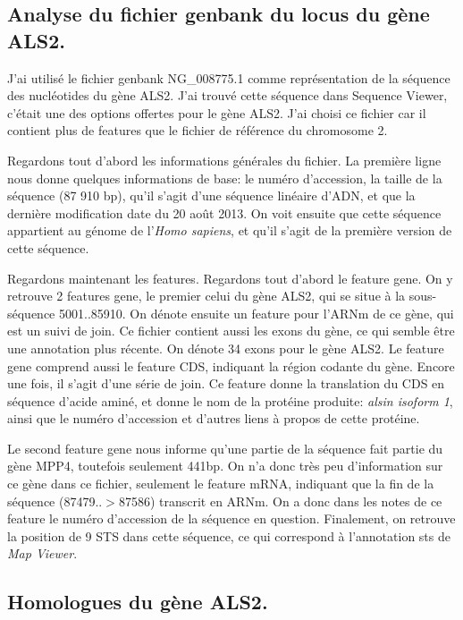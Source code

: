 \documentclass[10.9pt]{article} %
\begin{document}
\subsection[Fichier genbank du gène ALS2]{Analyse du fichier genbank du locus du gène ALS2.}

J'ai utilisé le fichier genbank NG\_008775.1 comme représentation de la séquence des nucléotides du gène ALS2. J'ai
trouvé cette séquence dans Sequence Viewer, c'était une des options offertes pour le gène ALS2. J'ai choisi ce fichier
car il contient plus de features que le fichier de référence du chromosome 2.

Regardons tout d'abord les informations générales du fichier. La première ligne nous donne quelques informations de 
base: le numéro d'accession, la taille de la séquence (87 910 bp), qu'il s'agit d'une séquence linéaire d'ADN, 
et que la dernière modification date du 20 août 2013. On voit ensuite que cette séquence appartient au génome de l'\emph{Homo sapiens}, et qu'il s'agit de la première version de cette séquence.

Regardons maintenant les features. Regardons tout d'abord le feature gene. On y retrouve 2 features gene,
le premier celui du gène ALS2, qui se situe à la sous-séquence 5001..85910. On dénote ensuite un feature pour l'ARNm
de ce gène, qui est un suivi de join. Ce fichier contient aussi les exons du gène, ce qui semble être
une annotation plus récente. On dénote 34 exons pour le gène ALS2. Le feature gene comprend aussi le feature CDS,
indiquant la région codante du gène. Encore une fois, il s'agit d'une série de join. Ce feature donne la
translation du CDS en séquence d'acide aminé, et donne le nom de la protéine produite: \emph{alsin isoform 1}, ainsi
que le numéro d'accession et d'autres liens à propos de cette protéine.

Le second feature gene nous informe qu'une partie de la séquence fait partie du gène MPP4, toutefois seulement
441bp. On n'a donc très peu d'information sur ce gène dans ce fichier, seulement le feature mRNA, indiquant que la 
fin de la séquence (87479..$>$87586) transcrit en ARNm. On a donc dans les notes de ce feature le numéro d'accession
de la séquence en question. Finalement, on retrouve la position de 9 STS dans cette séquence, ce qui correspond
à l'annotation sts de \emph{Map Viewer}.

\subsection[Homologues du gène ALS2]{Homologues du gène ALS2.}
\end{document}
